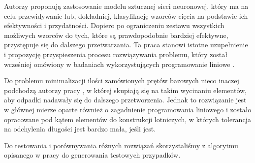 Autorzy proponują zastosowanie modelu sztucznej sieci neuronowej, który ma na celu przewidywanie lub, dokładniej, klasyfikację wzorców cięcia na podstawie ich efektywności i przydatności. Dopiero po ograniczeniu zestawu wszystkich możliwych wzorców do tych, które są prawdopodobnie bardziej efektywne, przystępuje się do dalszego przetwarzania. Ta praca stanowi istotne uzupełnienie i propozycję przyspieszenia procesu rozwiązywania problemu, który został wcześniej omówiony w badaniach wykorzystujących programowanie liniowe \cite{linear-programming}.

Do problemu minimalizacji ilości zamówionych prętów bazowych nieco inaczej podchodzą autorzy pracy \cite{structural-tubes}, w której skupiają się na takim wycinaniu elementów, aby odpadki nadawały się do dalszego przetworzenia. Jednak to rozwiązanie jest w głównej mierze oparte również o zagadnienie programowania liniowego i zostało opracowane pod kątem elementów do konstrukcji lotniczych, w których tolerancja na odchylenia długości jest bardzo mała, jeśli jest.

Do testowania i porównywania różnych rozwiązań skorzystaliśmy z algorytmu opisanego w pracy \cite{problem-generator} do generowania testowych przypadków.
